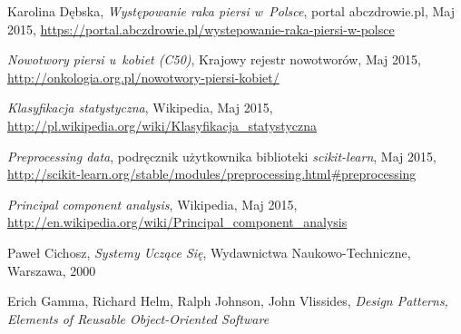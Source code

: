 \documentclass[../thesis.tex]{subfiles}
\begin{document}
\begin{thebibliography}{99}
\label{bibliography}

Karolina Dębska, \emph{Występowanie raka piersi w~Polsce}, portal abczdrowie.pl, Maj 2015,  \url{https://portal.abczdrowie.pl/wystepowanie-raka-piersi-w-polsce}

\emph{Nowotwory piersi u~kobiet (C50)}, Krajowy rejestr nowotworów, Maj 2015, \url{http://onkologia.org.pl/nowotwory-piersi-kobiet/}

\emph{Klasyfikacja statystyczna}, Wikipedia, Maj 2015, \url{http://pl.wikipedia.org/wiki/Klasyfikacja_statystyczna}

\emph{Preprocessing data}, podręcznik użytkownika biblioteki \emph{scikit-learn}, Maj 2015, \url{http://scikit-learn.org/stable/modules/preprocessing.html#preprocessing}

\emph{Principal component analysis}, Wikipedia, Maj 2015, \url{http://en.wikipedia.org/wiki/Principal_component_analysis}

Paweł Cichosz, \emph{Systemy Uczące Się}, Wydawnictwa Naukowo-Techniczne, Warszawa, 2000

Erich Gamma, Richard Helm, Ralph Johnson, John Vlissides,
\emph{Design Patterns, Elements of Reusable Object-Oriented Software}
				
\end{thebibliography}
\end{document}
